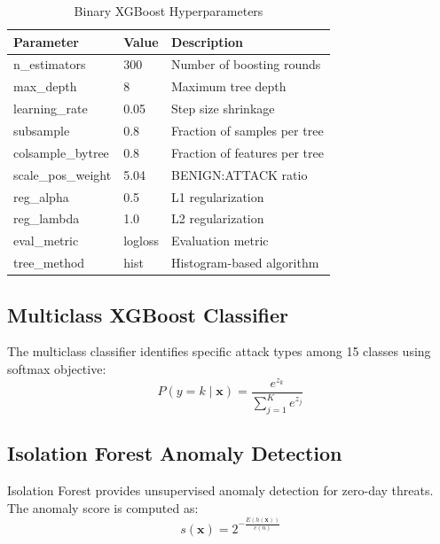 \documentclass[12pt,a4paper]{report}
\begin{document}
\begin{table}[htbp]
\centering
\caption{Binary XGBoost Hyperparameters}
\label{tab:binary_hyperparameters}
\renewcommand{\arraystretch}{1.3}
\begin{tabularx}{\textwidth}{|p{3.5cm}|p{3.5cm}|X|}
\hline
\textbf{Parameter} & \textbf{Value} & \textbf{Description} \\
\hline
n\_estimators & 300 & Number of boosting rounds \\
\hline
max\_depth & 8 & Maximum tree depth \\
\hline
learning\_rate & 0.05 & Step size shrinkage \\
\hline
subsample & 0.8 & Fraction of samples per tree \\
\hline
colsample\_bytree & 0.8 & Fraction of features per tree \\
\hline
scale\_pos\_weight & 5.04 & BENIGN:ATTACK ratio \\
\hline
reg\_alpha & 0.5 & L1 regularization \\
\hline
reg\_lambda & 1.0 & L2 regularization \\
\hline
eval\_metric & logloss & Evaluation metric \\
\hline
tree\_method & hist & Histogram-based algorithm \\
\hline
\end{tabularx}
\end{table}

\subsection{Multiclass XGBoost Classifier}

The multiclass classifier identifies specific attack types among 15 classes using softmax objective:
\begin{equation}
P(y = k \mid \mathbf{x}) = \frac{e^{z_k}}{\sum_{j=1}^{K} e^{z_j}}
\end{equation}

\subsection{Isolation Forest Anomaly Detection}

Isolation Forest provides unsupervised anomaly detection for zero-day threats. The anomaly score is computed as:
\begin{equation}
s(\mathbf{x}) = 2^{-\frac{E(h(\mathbf{x}))}{c(n)}}
\end{equation}
\end{document}
